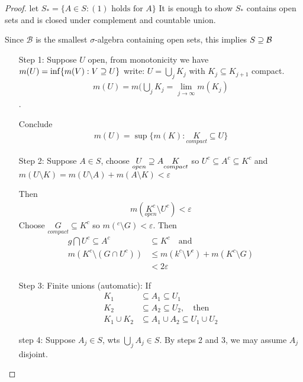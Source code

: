 \begin{proof}
	let $S_{*} = \{A \in S: (1) \text{ holds for $A$} \}$
It is enough to show $S_{*}$ contains open sets and is closed under complement and countable union.

Since $\mathcal{B}$ is the smallest $\sigma$-algebra containing open sets, this implies $S \supseteq \mathcal{B}$

\begin{enumerate}
	\item[Step 1:] Suppose $U$ open, from monotonicity we have $m(U) = \inf\{m(V) : V \supseteq U \}$
		write: $U = \bigcup_j K_j$ with  $K_j \subseteq K_{j+1}$ compact.
		\begin{align*}
			m(U) = m(\bigcup_j K_j = \lim_{j \to \infty} m(K_j)
		\end{align*} .

		Conclude
		\begin{align*}
			m(U) = \sup\{m(K) : \underset{compact}{K} \subseteq U \}
		\end{align*}

	\item[Step 2:] Suppose $A \in S$, choose $\underset{open}{U} \supseteq A \underset{compact}{K}$
		so $U^{c} \subseteq A^{c} \subseteq K^{c}$ and $m(U \setminus K) = m(U \setminus A) +m (A \setminus K) < \varepsilon$

		Then
		\begin{align*}
			m(\underset{open}{K^{c}} \setminus \underset{}{U^{c}}) < \varepsilon
		\end{align*}
		Choose $\underset{compact}{G} \subseteq K^{c}$ so $m(^{c} \setminus G) < \varepsilon$. Then 
	\begin{align*}
		g \bigcap U^{c} \subseteq A^{c} &\subseteq K^{c} \quad \text{and} \\
	m(K^{c} \setminus (G \cap U^{c})) &\leq m(k^{c} \setminus V^{c}) + m(K^{c} \setminus G) \\
									 &< 2\varepsilon
	\end{align*} 	
\item[Step 3:]
	Finite unions (automatic):
	If \begin{align*}
		K_1 &\subseteq A_1 \subseteq U_1 \\
		K_2 &\subseteq A_2 \subseteq U_2, \quad \text{then} \\
		K_1 \cup K_2 &\subseteq A_1 \cup A_2 \subseteq U_1 \cup U_2
	\end{align*} 
\item[step 4:]
	Suppose $A_j \in S$, wts $\bigcup_j A_j \in S$. By steps 2 and 3, we may assume  $A_j$ disjoint.


\end{enumerate}
\end{proof}

